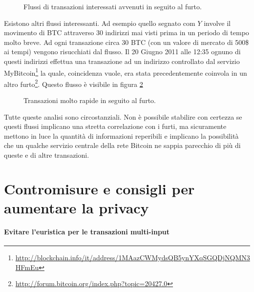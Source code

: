 \begin{figure}[htbp]
\centering
\caption{Flussi di transazioni interessati avvenuti in seguito al furto.\label{anonimato_1_13}}
\end{figure}

Esistono altri flussi interessanti. Ad esempio quello segnato com $Y$ involve il movimento di BTC attraverso 30 indirizzi mai visti prima in un periodo di tempo molto breve. Ad ogni transazione circa 30 BTC (con un valore di mercato di 500\$ ai tempi) vengono risucchiati dal flusso. Il 20 Giugno 2011 alle 12:35 ognuno di questi indirizzi effettua una transazione ad un indirizzo controllato dal servizio MyBitcoin\footnote{\url{http://blockchain.info/it/address/1MAazCWMydsQB5ynYXqSGQDjNQMN3HFmEu}} la quale, coincidenza vuole, era stata precedentemente coinvola in un altro furto\footnote{\url{http://forum.bitcoin.org/index.php?topic=20427.0}}. Questo flusso è visibile in figura \ref{anonimato_1_14}

\begin{figure}[htbp]
\centering
\caption{Transazioni molto rapide in seguito al furto.\label{anonimato_1_14}}
\end{figure}

Tutte queste analisi sono circostanziali. Non è possibile stabilire con certezza se questi flussi implicano una stretta correlazione con i furti, ma sicuramente mettono in luce la quantità di informazioni reperibili e implicano la possibilità che un qualche servizio centrale della rete Bitcoin ne sappia parecchio di più di queste e di altre transazioni.

\section{Contromisure e consigli per aumentare la privacy}

\paragraph{Evitare l'euristica per le transazioni multi-input}

